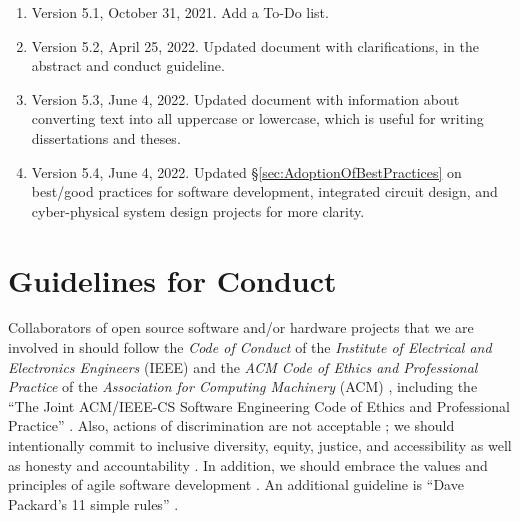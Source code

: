 \documentclass[letter,12pt]{article}
\begin{document}
\begin{enumerate}
\item Version 5.1, October 31, 2021. Add a To-Do list.
\item Version 5.2, April 25, 2022. Updated document with clarifications, in the abstract and conduct guideline.
\item Version 5.3, June 4, 2022. Updated document with information about converting text into all uppercase or lowercase, which is useful for writing dissertations and theses.
\item Version 5.4, June 4, 2022. Updated \S\ref{sec:AdoptionOfBestPractices} on best/good practices for software development, integrated circuit design, and cyber-physical system design projects for more clarity.
\end{enumerate}








\section{Guidelines for Conduct}
\label{sec:GuidelinesforConduct}



Collaborators of open source software and/or hardware projects that we are involved in should follow the {\it Code of Conduct} of the {\it Institute of Electrical and Electronics Engineers} (IEEE) \cite{IEEE2014b,IEEE2014a,IEEE2014} and the {\it ACM Code of Ethics and Professional Practice} of the {\it Association for Computing Machinery} (ACM) \cite{Gotterbarn2018b,Gotterbarn2018a,Gotterbarn2018,Brinkman2016a,ACMCouncil1992,Brinkman2017,Brinkman2016,Wolf2016,Anderson1993}, including the ``The Joint {ACM/IEEE-CS} Software Engineering Code of Ethics and Professional Practice'' \cite{Gotterbarn1999,Gotterbarn1997}. Also, actions of discrimination are not acceptable \cite{IEEE2014c}; we should intentionally commit to inclusive diversity, equity, justice, and accessibility \cite{Rich2022} as well as honesty \cite{Oluo2019,Delgado2017b,McCord2017,Molinsky2017,Reiner2016,Sandberg2014,Chang2013a,Gini2013,Rees2013,Sandberg2013,Stoker2013,Hanson2011,Maxwell2010,Lafair2009,Brach2004,Peterson2004,Putnam2000,Carnegie1936} and accountability \cite{Eitel2020,Gladwell2019,Doerr2018,ACMPublicPolicyOfficeStaff2017,Gentry2016,Molinaro2016,Fitzgerald2015,Shapiro2015a,Boehm2014,Cloud2013,Rees2013,Gary2012,Connors2011,Cushing2010,Carbajal2008,Forest2007,Godin2006,Wessner2003,Christian2020,PartnershipOnAIStaff2020,Sabeti2018,Rheem2017,TINYhrIncStaff2015,Stephens2013,Parker2012}. In addition, we should embrace the values and principles of agile software development \cite{Beedle2001a,Carter2019,Pescio1997}. An additional guideline is ``Dave Packard's 11 simple rules'' \cite{HewlettPackardCompany2012}. \\
\end{document}
